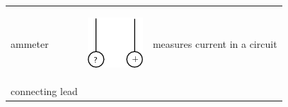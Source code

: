 \begin{center}
\begin{xtabular*}{\mytablewidth}[t]{|p{10\mystarwidth}|p{10\mystarwidth}|p{10\mystarwidth}|}
    
        ammeter &
    
    
        
                    
    \setcounter{subfigure}{0}

\label{m38771*id63126}
    \begin{center}
    \label{m38771*id63126!!!underscore!!!media}\label{m38771*id63126!!!underscore!!!printimage}\includegraphics{col11305.imgs/m38771_PG10C9_007.png} %
        
      \vspace{2pt}
    \vspace{.1in}
    
    \end{center}



    \addtocounter{footnote}{-0}
    
                   &
    
    
        measures current in a circuit%
     \tabularnewline{}
    
    
        connecting lead &
    
    
        

\end{xtabular*}
\end{center}
